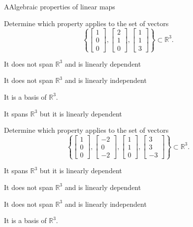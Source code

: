 \documentclass{article}
\newcommand{\IR}{\mathbb{R}}
\begin{document}
\begin{module}{A}{Algebraic properties of linear maps}
\begin{readinessAssuranceTest}
\item Determine which property applies to the set of vectors $$\left\{ \begin{bmatrix}  1 \\ 0 \\ 0 \end{bmatrix}, \begin{bmatrix} 2 \\ 1 \\ 0 \end{bmatrix} , \begin{bmatrix} 1 \\ 1 \\ 3 \end{bmatrix} \right\}\subset \IR^3.$$
\begin{readinessAssuranceTestChoices}
\item It does not span \(\IR^3\) and is linearly dependent
\item It does not span \(\IR^3\) and is linearly independent
\item It is a basis of \(\IR^3\). %
\item It spans \(\IR^3\) but it is linearly dependent
\end{readinessAssuranceTestChoices}

\newpage 
\item Determine which property applies to the set of vectors $$\left\{ \begin{bmatrix}  1 \\ 0 \\ 0 \end{bmatrix}, \begin{bmatrix} -2 \\ 0 \\ -2 \end{bmatrix} , \begin{bmatrix} 1 \\ 1 \\ 0 \end{bmatrix} , \begin{bmatrix} 3 \\ 3 \\ -3 \end{bmatrix}\right\}\subset \IR^3.$$
\begin{readinessAssuranceTestChoices}
\item It spans \(\IR^3\) but it is linearly dependent %
\item It does not span \(\IR^3\) and is linearly dependent
\item It does not span \(\IR^3\) and is linearly independent
\item It is a basis of \(\IR^3\).
\end{readinessAssuranceTestChoices}



\end{readinessAssuranceTest}
\end{module}
\end{document}

